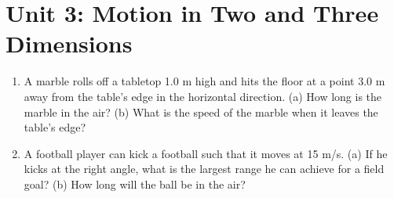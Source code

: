 \documentclass[10pt]{article}
\begin{document}
\section{Unit 3: Motion in Two and Three Dimensions}

\begin{enumerate}
\item A marble rolls off a tabletop 1.0 m high and hits the floor at a point 3.0 m away from the table’s edge in the horizontal direction. (a) How long is the marble in the air? (b) What is the speed of the marble when it leaves the table’s edge? \\ \vspace{1.5cm}
\item A football player can kick a football such that it moves at 15 m/s.  (a) If he kicks at the right angle, what is the largest range he can achieve for a field goal? (b) How long will the ball be in the air? \\ \vspace{0.75cm}
\end{enumerate}
\end{document}
